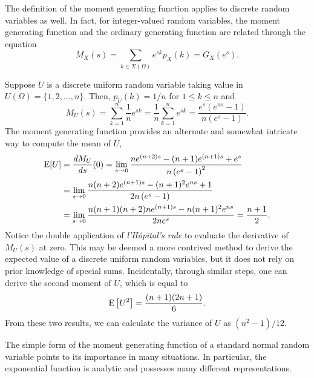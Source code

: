 The definition of the moment generating function applies to discrete random variables as well.
In fact, for integer-valued random variables, the moment generating function and the ordinary generating function are related through the equation  
\begin{equation*}
M_X (s) = \sum_{k \in X(\Omega)} e^{sk} p_X(k) = G_X (e^s) .
\end{equation*}

\begin{example}
Suppose $U$ is a discrete uniform random variable taking value in $U(\Omega) = \{ 1, 2, \ldots, n \}$.
Then, $p_U(k) = 1/n$ for $1 \leq k \leq n$ and
\begin{equation*}
M_U(s) = \sum_{k = 1}^n \frac{1}{n} e^{sk}
= \frac{1}{n} \sum_{k = 1}^n e^{sk}
= \frac {e^s (e^{ns} - 1)} {n (e^s - 1)} .
\end{equation*}
The moment generating function provides an alternate and somewhat intricate way to compute the mean of $U$,
\begin{equation*}
\begin{split}
\mathrm{E} [U] &= \frac{d M_U}{ds} (0)
= \lim_{s \rightarrow 0}
\frac{n e^{(n+2)s} - (n+1) e^{(n+1)s} + e^s}{n \left( e^s - 1 \right)^2} \\
&= \lim_{s \rightarrow 0}
\frac{n(n+2) e^{(n+1)s} - (n+1)^2 e^{ns} + 1}{2n \left( e^s - 1 \right)} \\
&= \lim_{s \rightarrow 0}
\frac{n(n+1)(n+2)n e^{(n+1)s} - n (n+1)^2 e^{ns}}{2n e^s}
= \frac {n + 1}{2} .
\end{split}
\end{equation*}
Notice the double application of \emph{l'H\^{o}pital's rule} to evaluate the derivative of $M_U(s)$ at zero.
This may be deemed a more contrived method to derive the expected value of a discrete uniform random variables, but it does not rely on prior knowledge of special sums.
Incidentally, through similar steps, one can derive the second moment of $U$, which is equal to
\begin{equation*}
\mathrm{E} \left[ U^2 \right] = \frac{(n+1)(2n+1)}{6} .
\end{equation*}
From these two results, we can calculate the variance of $U$ as $(n^2 - 1)/12$.
\end{example}

The simple form of the moment generating function of a standard normal random variable points to its importance in many situations.
In particular, the exponential function is analytic and possesses many different representations.

